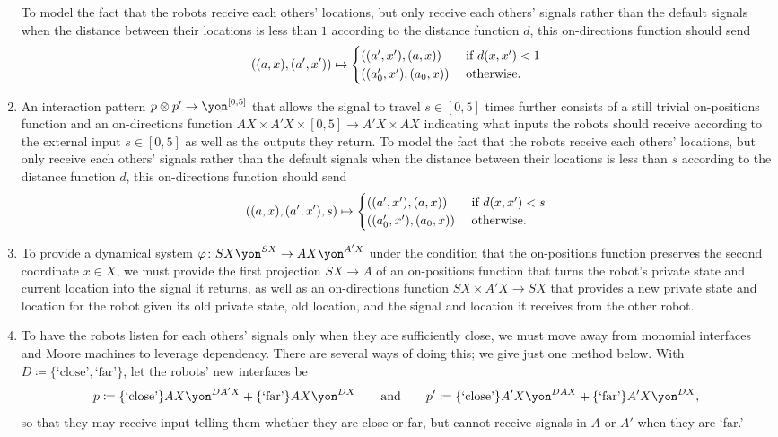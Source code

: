 \documentclass[Book-Poly]{subfiles}
\begin{document}
\begin{exercise}
\begin{solution}
\begin{enumerate}
    To model the fact that the robots receive each others' locations, but only receive each others' signals rather than the default signals when the distance between their locations is less than $1$ according to the distance function $d$, this on-directions function should send
    \[
        ((a,x),(a',x'))\mapsto
          \begin{cases}
          	((a',x'),(a,x))&\textnormal{ if }d(x,x')<1\\
          	((a'_0,x'),(a_0,x))&\textnormal{ otherwise}.
          \end{cases}
    \]
    \item An interaction pattern $p\otimes p'\to\yon^{[0,5]}$ that allows the signal to travel $s\in[0,5]$ times further consists of a still trivial on-positions function and an on-directions function $AX\times A'X\times[0,5]\to A'X\times AX$ indicating what inputs the robots should receive according to the external input $s\in[0,5]$ as well as the outputs they return.
    To model the fact that the robots receive each others' locations, but only receive each others' signals rather than the default signals when the distance between their locations is less than $s$ according to the distance function $d$, this on-directions function should send
    \[
        ((a,x),(a',x'),s)\mapsto
          \begin{cases}
          	((a',x'),(a,x))&\textnormal{ if }d(x,x')<s\\
          	((a'_0,x'),(a_0,x))&\textnormal{ otherwise}.
          \end{cases}
    \]
    \item To provide a dynamical system $\varphi\colon SX\yon^{SX}\to AX\yon^{A'X}$ under the condition that the on-positions function preserves the second coordinate $x\in X$, we must provide the first projection $SX\to A$ of an on-positions function that turns the robot's private state and current location into the signal it returns, as well as an on-directions function $SX\times A'X\to SX$ that provides a new private state and location for the robot given its old private state, old location, and the signal and location it receives from the other robot.

    \item To have the robots listen for each others' signals only when they are sufficiently close, we must move away from monomial interfaces and Moore machines to leverage dependency.
    There are several ways of doing this; we give just one method below.
    With $D\coloneqq\{\text{`close'},\text{`far'}\}$, let the robots' new interfaces be
    \[
        p\coloneqq \{\text{`close'}\}AX\yon^{DA'X}+\{\text{`far'}\}AX\yon^{DX} \qqand p'\coloneqq \{\text{`close'}\}A'X\yon^{DAX}+\{\text{`far'}\}A'X\yon^{DX},
    \]
    so that they may receive input telling them whether they are close or far, but cannot receive signals in $A$ or $A'$ when they are `far.'


\end{enumerate}
\end{solution}
\end{exercise}
\end{document}
